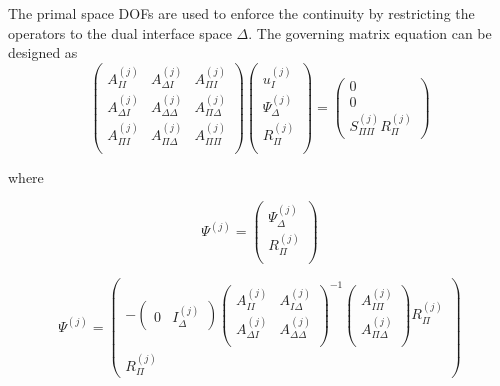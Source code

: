  The primal space DOFs are used to enforce the continuity by restricting the operators to the dual interface space $ \Delta $. The governing matrix equation can be designed as
 \begin{equation}
 \begin{pmatrix}
 A_{II}^{(j)} & A_{\Delta I}^{(j)} & A^{(j)}_{\Pi I} \\
 A_{\Delta I}^{(j)} & A_{\Delta \Delta}^{(j)} & A_{\Pi \Delta}^{(j)} \\
 A_{\Pi I}^{(j)} & A_{\Pi \Delta}^{(j)} & A_{\Pi \Pi}^{(j)} \\
 \end{pmatrix} \begin{pmatrix}
 u_{I}^{(j)} \\ \Psi_{\Delta}^{(j)} \\ R_{\Pi}^{(j)} \\
 \end{pmatrix} = \begin{pmatrix}
 0 \\ 0 \\ S_{\Pi \Pi}^{(j)} R_{\Pi}^{(j)}
 \end{pmatrix}
 \end{equation}
 
 where
 
 \begin{equation}
 \Psi^{(j)} = \begin{pmatrix}
 \Psi_{\Delta}^{(j)} \\ R_{\Pi}^{(j)} \\
 \end{pmatrix}
 \end{equation}
 
 \begin{equation}
 \Psi^{(j)} = \begin{pmatrix}
 -\begin{pmatrix}
 0 & I_{\Delta}^{(j)} 
 \end{pmatrix} \begin{pmatrix}
 A_{II}^{(j)} & A_{I \Delta}^{(j)} \\
 A_{\Delta I}^{(j)} & A_{\Delta \Delta}^{(j)} \\
 \end{pmatrix}^{-1} \begin{pmatrix}
 A_{I \Pi}^{(j)} \\ A_{\Pi \Delta}^{(j)} \\
 \end{pmatrix} R_{\Pi}^{(j)} \\
 R_{\Pi}^{(j)}
 \end{pmatrix}
 \end{equation}
 
